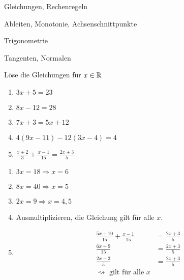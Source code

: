



\begin{inhalt}
  \item Gleichungen, Rechenregeln
  \item Ableiten, Monotonie, Achsenschnittpunkte
	\item Trigonometrie
	\item Tangenten, Normalen
\end{inhalt}


 Löse die Gleichungen für $x\in \mathbb{R}$
\begin{multicols}{3}
  \begin{enumerate}
    \item $3x + 5 = 23$
    \item $8x - 12 = 28$
    \item $7x + 3 = 5x + 12$
    \item $4(9x - 11) - 12(3x - 4) = 4$
    \item $\frac{x+2}{3} + \frac{x-1}{15} = \frac{2x+3}{5}$
  \end{enumerate}
\end{multicols}

\begin{lsg}{}
  \begin{multicols}{2}
    \begin{enumerate}
      \item $3x = 18 \Rightarrow x = 6$
      \item $8x = 40 \Rightarrow x = 5$
      \item $2x = 9 \Rightarrow x = 4,5$
      \item Ausmultiplizieren, die Gleichung gilt für alle $x$.
      \item \begin{align*}
        \frac{5x+10}{15} + \frac{x-1}{15} &= \frac{2x+3}{5}\\
        \frac{6x+9}{15} &= \frac{2x+3}{5}\\
        \frac{2x+3}{5} &= \frac{2x+3}{5}\\
        \rightsquigarrow \text{ gilt für alle }x&
      \end{align*}
    \end{enumerate}
  \end{multicols}
\end{lsg}





